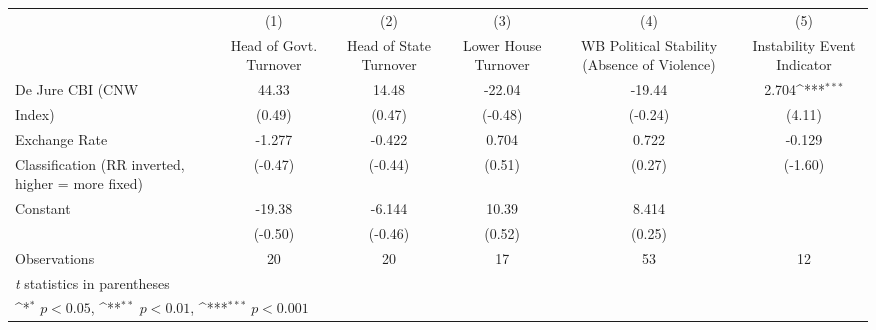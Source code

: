 {
\def\sym#1{\ifmmode^{#1}\else\(^{#1}\)\fi}
\begin{tabular}{l*{5}{c}}
\toprule
                &\multicolumn{1}{c}{(1)}&\multicolumn{1}{c}{(2)}&\multicolumn{1}{c}{(3)}&\multicolumn{1}{c}{(4)}&\multicolumn{1}{c}{(5)}\\
                &\multicolumn{1}{c}{Head of Govt. Turnover}&\multicolumn{1}{c}{Head of State Turnover}&\multicolumn{1}{c}{Lower House Turnover}&\multicolumn{1}{c}{WB Political Stability (Absence of Violence)}&\multicolumn{1}{c}{Instability Event Indicator}\\
\midrule
De Jure CBI (CNW&    44.33         &    14.48         &   -22.04         &   -19.44         &    2.704\sym{***}\\
Index)          &   (0.49)         &   (0.47)         &  (-0.48)         &  (-0.24)         &   (4.11)         \\
\addlinespace
Exchange Rate   &   -1.277         &   -0.422         &    0.704         &    0.722         &   -0.129         \\
Classification (RR inverted, higher = more fixed)&  (-0.47)         &  (-0.44)         &   (0.51)         &   (0.27)         &  (-1.60)         \\
\addlinespace
Constant        &   -19.38         &   -6.144         &    10.39         &    8.414         &                  \\
                &  (-0.50)         &  (-0.46)         &   (0.52)         &   (0.25)         &                  \\
\midrule
Observations    &       20         &       20         &       17         &       53         &       12         \\
\bottomrule
\multicolumn{6}{l}{\footnotesize \textit{t} statistics in parentheses}\\
\multicolumn{6}{l}{\footnotesize \sym{*} \(p<0.05\), \sym{**} \(p<0.01\), \sym{***} \(p<0.001\)}\\
\end{tabular}
}
